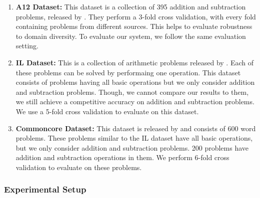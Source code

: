 \documentclass[11pt]{article}
\begin{document}
\begin{enumerate}
\item \textbf{A12 Dataset:} This dataset is a collection of 395 addition and subtraction problems, released by \citep{ARIS}. They perform a 3-fold cross validation, with every fold containing problems from different sources. This helps to evaluate robustness to domain diversity. To evaluate our system, we follow the same evaluation setting.

\item \textbf{IL Dataset:} This is a collection of arithmetic problems released by \citep{RoyTACL15}. Each of these problems can be solved by performaing one operation. This dataset consists of problems having all basic operations but we only consider addition and subtraction problems. Though, we cannot compare our results to them, we still achieve a competitive accuracy on addition and subtraction problems. We use a 5-fold cross validation to evaluate on this dataset.

\item \textbf{Commoncore Dataset:} This dataset is released by \citep{RoyR15} and consists of 600 word problems. These problems similar to the IL dataset have all basic operations, but we only consider addition and subtraction problems. 200 problems have addition and subtraction operations in them. We perform 6-fold cross validation to evaluate on these problems.
\end{enumerate}


\subsubsection{Experimental Setup}
\newpage


\end{document}
